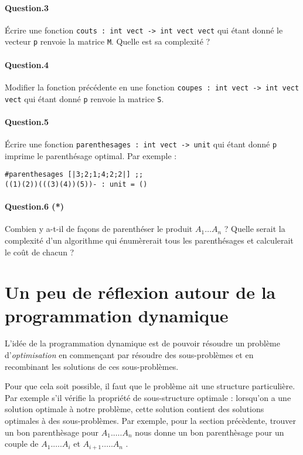 \documentclass[10pt,a4paper]{article}
\begin{document}
\paragraph{Question.3} Écrire une fonction \texttt{couts : int vect -> int vect vect}
qui étant donné le vecteur \texttt{p} renvoie la matrice \texttt{M}. Quelle est
sa complexité ?

\paragraph{Question.4} Modifier la fonction précédente en une fonction 
\texttt{coupes : int vect -> int vect vect} qui étant donné \texttt{p} renvoie
la matrice \texttt{S}.

\paragraph{Question.5} Écrire une fonction \texttt{parenthesages : int vect -> unit}
qui étant donné \texttt{p} imprime le parenthésage optimal. Par exemple :
\begin{verbatim}#parenthesages [|3;2;1;4;2;2|] ;;
((1)(2))(((3)(4))(5))- : unit = () \end{verbatim}

\paragraph{Question.6 (*)} Combien y a-t-il de façons de parenthéser le produit
$A_1 \dots A_n$ ? Quelle serait la complexité d'un algorithme qui énumèrerait
tous les parenthésages et calculerait le coût de chacun ?

\section{Un peu de réflexion autour de la programmation dynamique}
L'idée de la programmation dynamique est de pouvoir résoudre un problème
d'\emph{optimisation} en
commençant par résoudre des sous-problèmes et en recombinant les solutions de
ces sous-problèmes. 

Pour que cela soit possible, il faut que le problème ait une structure
particulière. Par exemple s'il vérifie la propriété de sous-structure optimale :
lorsqu'on a une solution optimale à notre problème, cette solution contient des
solutions optimales à des sous-problèmes.
Par exemple, pour la section précèdente, trouver un bon parenthèsage pour
$A_1.\dots.A_n$ nous donne un bon parenthèsage pour un couple de 
$A_1.\dots.A_i$ et $A_{i+1}.\dots.A_n$ .
\end{document}
